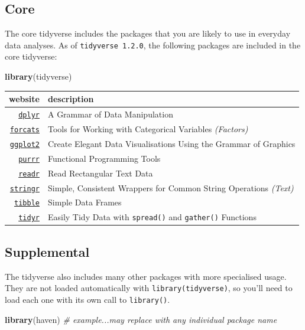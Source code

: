 \documentclass[]{book}
\newenvironment{Shaded}{\begin{snugshade}}{\end{snugshade}}
\newcommand{\KeywordTok}[1]{\textcolor[rgb]{0.13,0.29,0.53}{\textbf{#1}}}
\newcommand{\CommentTok}[1]{\textcolor[rgb]{0.56,0.35,0.01}{\textit{#1}}}
\newcommand{\NormalTok}[1]{#1}
\theoremstyle{definition}
\theoremstyle{definition}
\theoremstyle{definition}
\theoremstyle{remark}
\begin{document}
\subsection{Core}\label{core}

The core tidyverse includes the packages that you are likely to use in
everyday data analyses. As of \texttt{tidyverse\ 1.2.0}, the following
packages are included in the core tidyverse:

\begin{Shaded}
\begin{Highlighting}[]
\KeywordTok{library}\NormalTok{(tidyverse)}
\end{Highlighting}
\end{Shaded}

\begin{longtable}[]{@{}rl@{}}
\toprule
website & description\tabularnewline
\midrule
\endhead
\href{https://dplyr.tidyverse.org/}{\texttt{dplyr}} & A Grammar of Data
Manipulation\tabularnewline
\href{https://forcats.tidyverse.org/}{\texttt{forcats}} & Tools for
Working with Categorical Variables \emph{(Factors)}\tabularnewline
\href{https://ggplot2.tidyverse.org/}{\texttt{ggplot2}} & Create Elegant
Data Visualisations Using the Grammar of Graphics\tabularnewline
\href{https://purrr.tidyverse.org/}{\texttt{purrr}} & Functional
Programming Tools\tabularnewline
\href{https://readr.tidyverse.org/}{\texttt{readr}} & Read Rectangular
Text Data\tabularnewline
\href{https://stringr.tidyverse.org/}{\texttt{stringr}} & Simple,
Consistent Wrappers for Common String Operations
\emph{(Text)}\tabularnewline
\href{https://tibble.tidyverse.org/}{\texttt{tibble}} & Simple Data
Frames\tabularnewline
\href{https://tidyr.tidyverse.org/}{\texttt{tidyr}} & Easily Tidy Data
with \texttt{spread()} and \texttt{gather()} Functions\tabularnewline
\bottomrule
\end{longtable}

\subsection{Supplemental}\label{supplemental}

The tidyverse also includes many other packages with more specialised
usage. They are not loaded automatically with
\texttt{library(tidyverse)}, so you'll need to load each one with its
own call to \texttt{library()}.

\begin{Shaded}
\begin{Highlighting}[]
\KeywordTok{library}\NormalTok{(haven) }\CommentTok{# example...may replace with any individual package name}
\end{Highlighting}
\end{Shaded}
\end{document}
